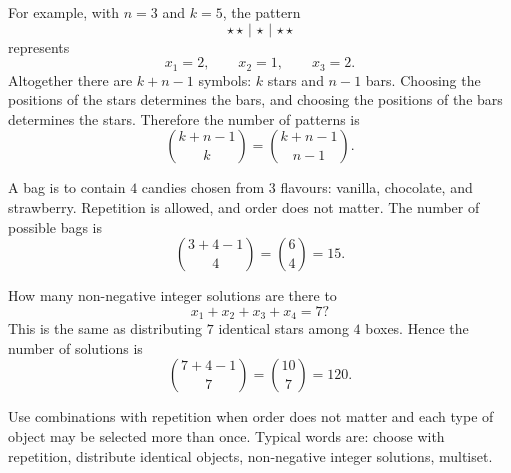 For example, with \(n=3\) and \(k=5\), the pattern
\[
\star\star\,|\,\star\,|\,\star\star
\]
represents
\[
x_1=2,
\qquad
x_2=1,
\qquad
x_3=2.
\]
Altogether there are \(k+n-1\) symbols: \(k\) stars and \(n-1\) bars. Choosing the positions of the stars determines the bars, and choosing the positions of the bars determines the stars. Therefore the number of patterns is
\[
\binom{k+n-1}{k}=\binom{k+n-1}{n-1}.
\]

\begin{examplebox}
A bag is to contain \(4\) candies chosen from \(3\) flavours: vanilla, chocolate, and strawberry. Repetition is allowed, and order does not matter. The number of possible bags is
\[
\binom{3+4-1}{4}=\binom{6}{4}=15.
\]
\end{examplebox}

\begin{examplebox}
How many non-negative integer solutions are there to
\[
x_1+x_2+x_3+x_4=7?
\]
This is the same as distributing \(7\) identical stars among \(4\) boxes. Hence the number of solutions is
\[
\binom{7+4-1}{7}=\binom{10}{7}=120.
\]
\end{examplebox}

\begin{remarkbox}
Use combinations with repetition when order does not matter and each type of object may be selected more than once. Typical words are: choose with repetition, distribute identical objects, non-negative integer solutions, multiset.
\end{remarkbox}
